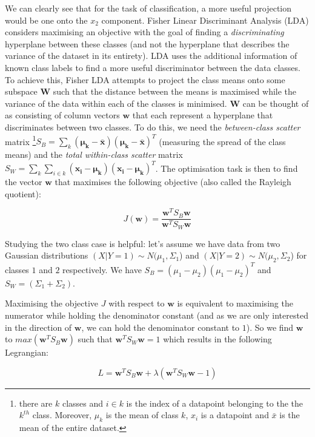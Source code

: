 \documentclass{article}
\begin{document}
We can clearly see that for the task of classification, a more useful projection would be one onto the $x_2$ component. Fisher Linear Discriminant Analysis (LDA) considers maximising an objective with the goal of finding a \textit{discriminating} hyperplane between these classes \cite{welling2005fisher} (and not the hyperplane that describes the variance of the dataset in its entirety). LDA uses the additional information of known class labels to find a more useful discriminator between the data classes. To achieve this, Fisher LDA attempts to project the class means onto some subspace $\mathbf{W}$ such that the distance between the means is maximised while the variance of the data within each of the classes is minimised. $\mathbf{W}$ can be thought of as consisting of column vectors $\mathbf{w}$ that each represent a hyperplane that discriminates between two classes. To do this, we need the \textit{between-class scatter} matrix \footnote{there are $k$ classes and $i \in k$ is the index of a datapoint belonging to the the $k^{th}$ class. Moreover, $\mu_k$ is the mean of class $k$, $x_i$ is a datapoint and $\bar{x}$ is the mean of the entire dataset.}$S_B = \sum_k(\mathbf{\mu_k - \mathbf{\bar{x}}})(\mathbf{\mu_k - \mathbf{\bar{x}}})^T$ (measuring the spread of the class means) and the \textit{total within-class scatter} matrix $S_W = \sum_k \sum_{i \in k}(\mathbf{x_i} - \mathbf{\mu_k})(\mathbf{x_i} - \mathbf{\mu_k})^T$. The optimisation task is then to find the vector $\mathbf{w}$ that maximises the following objective (also called the Rayleigh quotient):

$$
J(\mathbf{w}) = \frac{\mathbf{w}^TS_B\mathbf{w}}{\mathbf{w}^TS_W\mathbf{w}}
$$

Studying the two class case is helpful: let's assume we have data from two Gaussian distributions $(X|Y=1) \sim N(\mu_1, \Sigma_1$) and $(X|Y=2) \sim N(\mu_2, \Sigma_2$) for classes $1$ and $2$ respectively. We have $S_B = (\mu_1 - \mu_2)(\mu_1 - \mu_2)^T$ and $S_W = (\Sigma_1 + \Sigma_2)$.

Maximising the objective $J$ with respect to $\mathbf{w}$ is equivalent to maximising the numerator while holding the denominator constant (and as we are only interested in the direction of $\mathbf{w}$, we can hold the denominator constant to $1$). So we find $\mathbf{w}$ to $max (\mathbf{w}^TS_B\mathbf{w})$ such that $\mathbf{w}^TS_W\mathbf{w} = 1$ which results in the following Legrangian:

$$
L = \mathbf{w}^T S_B\mathbf{w} + \lambda(\mathbf{w}^T S_W\mathbf{w} - 1)
$$
\end{document}
